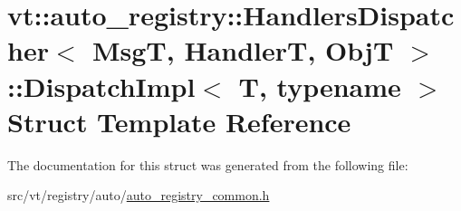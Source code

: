 \hypertarget{structvt_1_1auto__registry_1_1_handlers_dispatcher_1_1_dispatch_impl}{}\section{vt\+:\+:auto\+\_\+registry\+:\+:Handlers\+Dispatcher$<$ MsgT, HandlerT, ObjT $>$\+:\+:Dispatch\+Impl$<$ T, typename $>$ Struct Template Reference}
\label{structvt_1_1auto__registry_1_1_handlers_dispatcher_1_1_dispatch_impl}


The documentation for this struct was generated from the following file\+:\begin{DoxyCompactItemize}
\item 
src/vt/registry/auto/\hyperlink{auto__registry__common_8h}{auto\+\_\+registry\+\_\+common.\+h}\end{DoxyCompactItemize}
